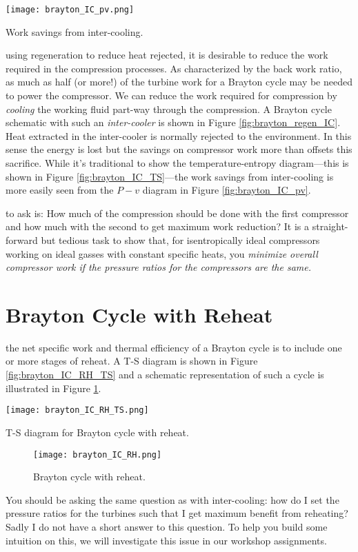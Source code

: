 \begin{marginfigure}
\texttt{[image: brayton\_IC\_pv.png]}
\caption{Work savings from inter-cooling.}
\label{fig:brayton_IC_pv}
\end{marginfigure}
 using regeneration to reduce heat rejected, it is desirable to reduce the work required in the compression processes.  As characterized by the back work ratio, as much as half (or more!) of the turbine work for a Brayton cycle may be needed to power the compressor.  We can reduce the work required for compression by \emph{cooling} the working fluid part-way through the compression.  A Brayton cycle schematic with such an \emph{inter-cooler} is shown in Figure \ref{fig:brayton_regen_IC}. Heat extracted in the inter-cooler is normally rejected to the environment.  In this sense the energy is lost but the savings on compressor work more than offsets this sacrifice.  While it's traditional to show the temperature-entropy diagram---this is shown in Figure \ref{fig:brayton_IC_TS}---the work savings from inter-cooling is more easily seen from the $P-v$ diagram in Figure \ref{fig:brayton_IC_pv}. 



 to ask is: How much of the compression should be done with the first compressor and how much with the second to get maximum work reduction?  It is a straight-forward but tedious task to show that, for isentropically ideal compressors working on ideal gasses with constant specific heats, you \emph{minimize overall compressor work if the pressure ratios for the compressors are the same.}  


\section{Brayton Cycle with Reheat}


 the net specific work and thermal efficiency of a Brayton cycle is to include one or more stages of reheat.  A T-S diagram is shown in Figure \ref{fig:brayton_IC_RH_TS} and a schematic representation of such a cycle is illustrated in Figure \ref{fig:brayton_IC_RH}.
\begin{marginfigure}
\texttt{[image: brayton\_IC\_RH\_TS.png]}
\caption{T-S diagram for Brayton cycle with reheat.}
\label{fig:brayton_IC_RH_TS}
\end{marginfigure}

\begin{figure}
\texttt{[image: brayton\_IC\_RH.png]}
\caption{Brayton cycle with reheat.}
\label{fig:brayton_IC_RH}
\end{figure}

You should be asking the same question as with inter-cooling: how do I set the pressure ratios for the turbines such that I get maximum benefit from reheating?  Sadly I do not have a short answer to this question. To help you build some intuition on this, we will investigate this issue in our workshop assignments.


